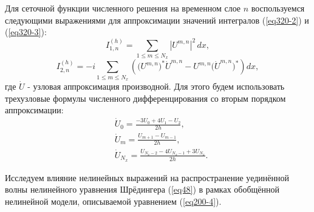 \documentclass[14pt,a4paper]{extreport}
\begin{document}
			Для сеточной функции численного решения на временном слое \(n\) воспользуемся следующими выражениями для аппроксимации значений интегралов (\ref{eq320-2}) и (\ref{eq320-3}):
			\begin{equation}\label{eq320-4}
				I_{1,n}^{(h)}=\sum_{1 \leq m \leq N_{x}} |U^{m,n}|^{2} \, dx,
			\end{equation}
			\begin{equation}\label{eq320-5}
				I_{2,n}^{(h)}=-i \sum_{1 \leq m \leq N_{x}}\left(\big(U^{m,n}\big)^{*}\dot{U}^{m,n}-U^{m,n} \big(\dot{U}^{m,n}\big)^{*}\right) dx,
			\end{equation}
			где \(\dot{U}\) - узловая аппроксимация производной. Для этого будем использовать трехузловые формулы численного дифференцирования со вторым порядком аппроксимации:
			\begin{equation}\label{eq320-6}
				\begin{aligned}	
					&\dot{U}_{0} = \frac{-3U_{0} + 4U_{1} - U_{2}}{2h},\\
					&\dot{U}_{m} = \frac{U_{m+1} - U_{m-1}}{2h},\\
					&\dot{U}_{N_{x}} = \frac{U_{N_{x}-2} - 4U_{N_{x}-1} + 3U_{N_{x}}}{2h}.
				\end{aligned}
			\end{equation}

			Исследуем влияние нелинейных выражений на распространение уединённой волны нелинейного уравнения Шрёдингера (\ref{eq48}) в рамках обобщённой нелинейной модели, описываемой уравнением (\ref{eq200-4}).
\end{document}
